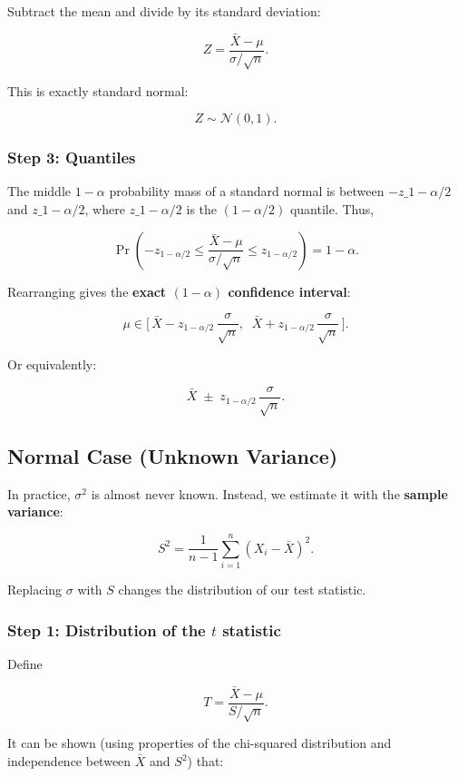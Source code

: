 \documentclass[
  letterpaper,
  DIV=11,
  numbers=noendperiod]{scrreprt}
\theoremstyle{definition}
\theoremstyle{plain}
\theoremstyle{definition}
\theoremstyle{remark}
\begin{document}
Subtract the mean and divide by its standard deviation:

\[
Z = \frac{\bar{X} - \mu}{\sigma/\sqrt{n}}.
\]

This is exactly standard normal:

\[
Z \sim \mathcal{N}(0,1).
\]

\subsubsection{Step 3: Quantiles}\label{step-3-quantiles}

The middle \(1-\alpha\) probability mass of a standard normal is between
\(-z\_{1-\alpha/2}\) and \(z\_{1-\alpha/2}\), where \(z\_{1-\alpha/2}\)
is the \((1-\alpha/2)\) quantile. Thus,

\[
\Pr\!\left(-z_{1-\alpha/2} \leq \frac{\bar{X}-\mu}{\sigma/\sqrt{n}} \leq z_{1-\alpha/2}\right) = 1-\alpha.
\]

Rearranging gives the \textbf{exact \((1-\alpha)\) confidence interval}:

\[
\mu \in \biggl[\,\bar{X} - z_{1-\alpha/2}\,\frac{\sigma}{\sqrt{n}}, \;\; \bar{X} + z_{1-\alpha/2}\,\frac{\sigma}{\sqrt{n}} \,\biggr].
\]

Or equivalently:

\[
\bar{X} \;\pm\; z_{1-\alpha/2}\,\frac{\sigma}{\sqrt{n}}.
\]

\subsection{Normal Case (Unknown
Variance)}\label{normal-case-unknown-variance}

In practice, \(\sigma^2\) is almost never known. Instead, we estimate it
with the \textbf{sample variance}:

\[
S^2 = \frac{1}{n-1}\sum_{i=1}^n (X_i - \bar{X})^2.
\]

Replacing \(\sigma\) with \(S\) changes the distribution of our test
statistic.

\subsubsection{\texorpdfstring{Step 1: Distribution of the \(t\)
statistic}{Step 1: Distribution of the t statistic}}\label{step-1-distribution-of-the-t-statistic}

Define

\[
T = \frac{\bar{X} - \mu}{S/\sqrt{n}}.
\]

It can be shown (using properties of the chi-squared distribution and
independence between \(\bar{X}\) and \(S^2\)) that:
\end{document}
